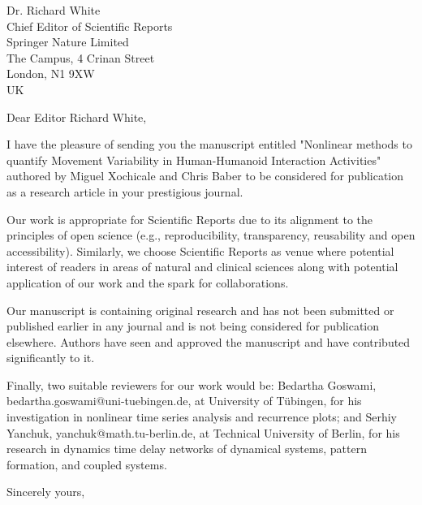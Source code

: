 \documentclass[10pt]{letter}
\begin{document}
\begin{letter}{Dr. Richard White \\
Chief Editor of Scientific Reports \\
Springer Nature Limited \\
The Campus, 4 Crinan Street\\
London, N1 9XW \\
UK
}
\opening{Dear Editor Richard White,}

I have the pleasure of sending you the manuscript entitled "Nonlinear methods to quantify Movement Variability in Human-Humanoid Interaction Activities" authored by Miguel Xochicale and Chris Baber to be considered for publication as a research article in your prestigious journal.

Our work is appropriate for Scientific Reports due to its alignment to the principles of open science (e.g., reproducibility, transparency, reusability and open accessibility).   
Similarly, we choose Scientific Reports as venue where potential interest of readers in areas of natural and clinical sciences along with potential application of our work and the spark for collaborations.

Our manuscript is containing original research and has not been submitted or published earlier in any journal and is not being considered for publication elsewhere.   
Authors have seen and approved the manuscript and have contributed significantly to it.

Finally, two suitable reviewers for our work would be: Bedartha Goswami, bedartha.goswami@uni-tuebingen.de, at University of Tübingen, for his investigation in nonlinear time series analysis and recurrence plots; and Serhiy Yanchuk, yanchuk@math.tu-berlin.de, at Technical University of Berlin, for his research in dynamics time delay networks of dynamical systems, pattern formation, and coupled systems.  


\closing{Sincerely yours,}


\end{letter}
\end{document}
